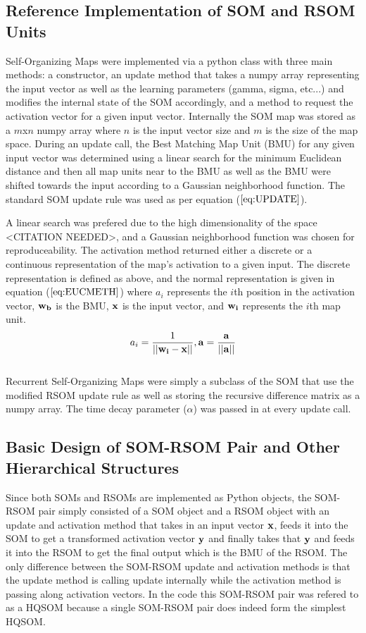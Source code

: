 \documentclass[a4paper,10pt]{article}
\begin{document}
\subsection{Reference Implementation of SOM and RSOM Units}
Self-Organizing Maps were implemented via a python class with three main methods: a constructor,
an update method that takes a numpy array representing the input vector as well as the learning
parameters (gamma, sigma, etc...) and modifies the internal state of the SOM accordingly, and a
method to request the activation vector for a given input vector. Internally the SOM map was stored
as a $m$x$n$ numpy array where $n$ is the input vector size and $m$ is the size of the map space. 
During an update call, the Best Matching Map Unit (BMU) for any given input vector was determined
using a linear search for the minimum Euclidean distance and then all map units near to the BMU as
well as the BMU were shifted towards the input according to a Gaussian neighborhood function.  The
standard SOM update rule was used as per equation ($\ref{eq:UPDATE}$).
 
A linear search was prefered due to the high dimensionality of the space <CITATION NEEDED>, and a
Gaussian neighborhood function was chosen for reproduceability.  The activation
method returned either a discrete or a continuous representation of the map's activation to a given
input. The discrete representation is defined as above, and the normal representation is given in
equation ($\ref{eq:EUCMETH}$) where $a_i$ represents the $i$th position in the activation vector,
$\bold{w_b}$ is the BMU, $\bold{x}$ is the input vector, and $\bold{w_i}$ represents the $i$th map
unit.
\begin{equation} \label{eq:EUCMETH}
 a_i = \frac{1}{||\bold{w_i}-\bold{x}||}, \bold{a} = \frac{\bold{a}}{||\bold{a}||}
\end{equation}
\\
Recurrent Self-Organizing Maps were simply a subclass of the SOM that use the modified RSOM update
rule as well as storing the recursive difference matrix as a numpy array.  The time decay parameter
($\alpha$) was passed in at every update call.

\subsection{Basic Design of SOM-RSOM Pair and Other Hierarchical Structures}
Since both SOMs and RSOMs are implemented as Python objects, the SOM-RSOM pair simply consisted of
a SOM object and a RSOM object with an update and activation method that takes in an input vector
$\bold{x}$, feeds it into the SOM to get a transformed activation vector $\bold{y}$ and finally
takes that $\bold{y}$ and feeds it into the RSOM to get the final output which is the BMU of the
RSOM.  The only difference between the SOM-RSOM update and activation methods is that the update
method is calling update internally while the activation method is passing along activation
vectors. In the code this SOM-RSOM pair was refered to as a HQSOM because a single SOM-RSOM pair
does indeed form the simplest HQSOM.
\end{document}
